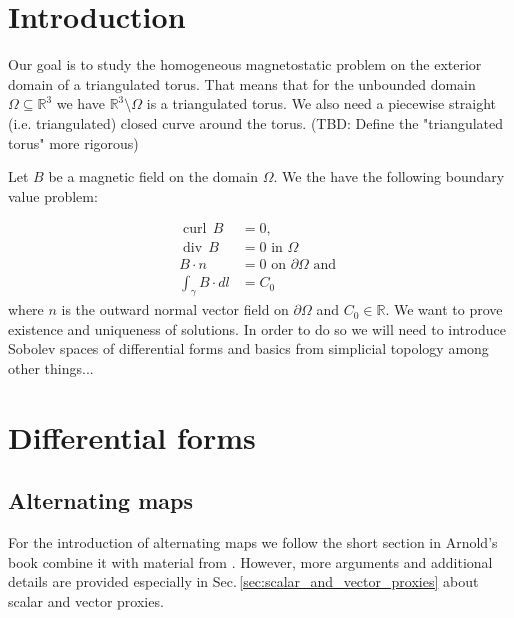 \documentclass[12pt,a4paper]{article}
\numberwithin{equation}{subsection}
\numberwithin{lemma}{subsection}
\theoremstyle{definition}
\DeclareMathOperator{\curl}{curl}
\DeclareMathOperator{\diver}{div}
\newcommand{\real}{\mathbb{R}}
\begin{document}
\section{Introduction}
Our goal is to study the homogeneous magnetostatic problem on the exterior 
domain of a triangulated torus. That means 
that for the unbounded domain  $\Omega \subseteq \real^3$ we have
$\real^3 \setminus \Omega$ is a triangulated torus. We also need a 
piecewise straight (i.e. triangulated) closed curve around the torus.
{\color{red} (TBD: Define the "triangulated torus" more rigorous)}

Let $B$ be a magnetic field on the domain $\Omega$.
We the have the following boundary value problem:

\begin{align}
    \curl \, B &= 0, \\ 
    \diver \, B  &= 0 \text{ in } \Omega \\
    B \cdot n &= 0 \text{ on } \partial \Omega \text{ and }\\
    \int_\gamma B \cdot dl &= C_0
\end{align}
where $n$ is the outward normal vector field on $\partial \Omega$ and 
$C_0 \in \real$. We want to prove existence and uniqueness of 
solutions. In order to do so we will need to introduce Sobolev spaces of 
differential forms and basics from
simplicial topology {\color{red} among other things...}

\section{Differential forms}


\subsection{Alternating maps} \label{sec:alternating_maps}

For the introduction of alternating maps we follow
the short section in Arnold's book
\cite[Sec. 6.1.]{arnold} combine it 
with material from \cite[Sec.\,V.1]{topology_and_geometry}.
However, more arguments and additional details are provided especially  
in Sec.\,\ref{sec:scalar_and_vector_proxies} about scalar and vector proxies.
\end{document}
